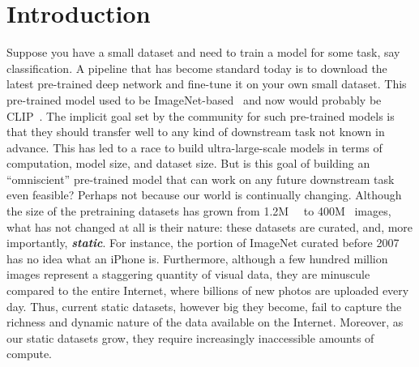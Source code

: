 \chapter{Introduction}

Suppose you have a small dataset and need to train a model for some task, say classification.
A pipeline that has become standard today is to download the latest pre-trained deep network and fine-tune it on your own small dataset. This pre-trained model used to be ImageNet-based~\cite{deng2009imagenet,he2016deep} and now would probably be CLIP~\cite{radford2021learning}. The implicit goal set by the community for such pre-trained models is that they should transfer well to any kind of downstream task not known in advance. This has led to a race to build ultra-large-scale models in terms of computation, model size, and dataset size. But is this goal of building an ``omniscient'' pre-trained model that can work on any future downstream task even feasible? Perhaps not because our world is continually changing.
Although the size of the pretraining datasets has grown from 1.2M~~\cite{deng2009imagenet} to 400M~\cite{schuhmann2021laion} images, what has not changed at all is their nature: these datasets are curated, and, more importantly, \textit{\textbf{static}}. For instance, the portion of ImageNet curated before 2007 has no idea what an iPhone is.
Furthermore, although a few hundred million images represent a staggering quantity of visual data, they are minuscule compared to the entire Internet, where billions of new photos are uploaded every day.
Thus, current static datasets, however big they become,
fail to capture the richness and dynamic nature of the data available on the Internet.
Moreover, as our static datasets grow, they require increasingly inaccessible amounts of compute.


